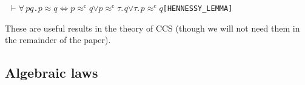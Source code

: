 \documentclass[GCNS]{yincog}
\renewcommand{\HOLBoundVar}[1]{\ensuremath{\mathit{#1}}}
\renewcommand{\HOLSymConst}[1]{#1}
\renewcommand{\HOLTokenEquiv}{\ensuremath{\Longleftrightarrow}}
\renewcommand{\HOLTokenForall}{\ensuremath{\forall \,}}
\renewcommand{\HOLTokenTurnstile}{\ensuremath{\:\:\vdash}}
\renewcommand{\HOLTokenDisj}{\ensuremath{\vee}}
\theoremstyle{remark}
\theoremstyle{theorem}
\theoremstyle{remark}
\newcommand{\HOLTokenWeakEQ}{$\approx$}
\newcommand{\HOLTokenObsCongr}{$\approx^{\mathrm{c}}\!$}
\begin{document}
\begin{alltt}
\HOLTokenTurnstile{} \HOLSymConst{\HOLTokenForall{}}\HOLBoundVar{p} \HOLBoundVar{q}. \HOLBoundVar{p} \HOLSymConst{\HOLTokenWeakEQ} \HOLBoundVar{q} \HOLSymConst{\HOLTokenEquiv{}} \HOLBoundVar{p} \HOLSymConst{\HOLTokenObsCongr} \HOLBoundVar{q} \HOLSymConst{\HOLTokenDisj{}} \HOLBoundVar{p} \HOLSymConst{\HOLTokenObsCongr} \HOLSymConst{\ensuremath{\tau}}\HOLSymConst{\ensuremath{\ldotp}}\HOLBoundVar{q} \HOLSymConst{\HOLTokenDisj{}} \HOLSymConst{\ensuremath{\tau}}\HOLSymConst{\ensuremath{\ldotp}}\HOLBoundVar{p} \HOLSymConst{\HOLTokenObsCongr} \HOLBoundVar{q}\hfill{[HENNESSY\_LEMMA]}
\end{alltt}
%
These are useful results in the theory of CCS (though we will not need
them in the remainder of the paper).

\subsection{Algebraic laws}
 \label{ss:alaws}
\end{document}
